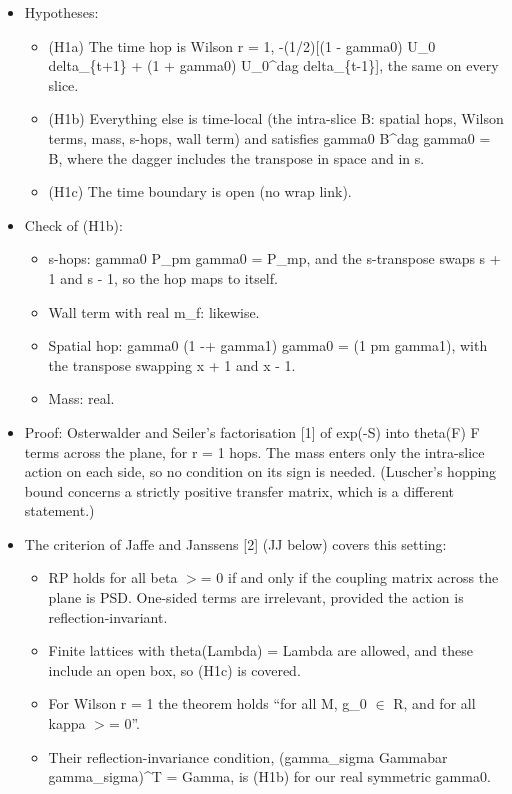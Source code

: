 \documentclass[11pt,a4paper]{article}
\begin{document}
\begin{itemize}
\item{} Hypotheses:
\begin{itemize}
\item{} (H1a) The time hop is Wilson r = 1, -(1/2)[(1 - gamma0) U\_0 delta\_\{t+1\} + (1 + gamma0) U\_0\textasciicircum{}dag delta\_\{t-1\}], the
same on every slice.
\item{} (H1b) Everything else is time-local (the intra-slice B: spatial hops, Wilson terms, mass, s-hops, wall term) and
satisfies gamma0 B\textasciicircum{}dag gamma0 = B, where the dagger includes the transpose in space and in s.
\item{} (H1c) The time boundary is open (no wrap link).
\end{itemize}

\item{} Check of (H1b):
\begin{itemize}
\item{} s-hops: gamma0 P\_pm gamma0 = P\_mp, and the s-transpose swaps s + 1 and s - 1, so the hop maps to itself.
\item{} Wall term with real m\_f: likewise.
\item{} Spatial hop: gamma0 (1 -+ gamma1) gamma0 = (1 pm gamma1), with the transpose swapping x + 1 and x - 1.
\item{} Mass: real.
\end{itemize}

\item{} Proof: Osterwalder and Seiler's factorisation [1] of exp(-S) into theta(F) F terms across the plane, for r = 1 hops. The
mass enters only the intra-slice action on each side, so no condition on its sign is needed. (Luscher's hopping
bound concerns a strictly positive transfer matrix, which is a different statement.)
\item{} The criterion of Jaffe and Janssens [2] (JJ below) covers this setting:
\begin{itemize}
\item{} RP holds for all beta $>$= 0 if and only if the coupling matrix across the plane is PSD. One-sided terms are
irrelevant, provided the action is reflection-invariant.
\item{} Finite lattices with theta(Lambda) = Lambda are allowed, and these include an open box, so (H1c) is covered.
\item{} For Wilson r = 1 the theorem holds ``for all M, g\_0 $\in$ R, and for all kappa $>$= 0''.
\item{} Their reflection-invariance condition, (gamma\_sigma Gammabar gamma\_sigma)\textasciicircum{}T = Gamma, is (H1b) for our real
symmetric gamma0.
\end{itemize}


\end{itemize}
\end{document}
